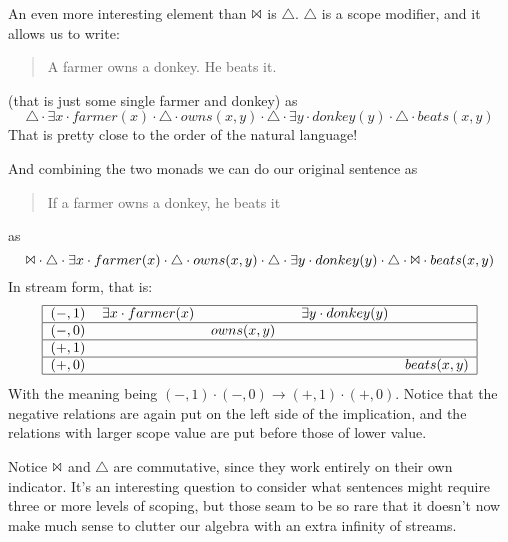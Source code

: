 \documentclass[12pt]{article}
\begin{document}
An even more interesting element than $\Bowtie$ is $\triangle$. $\triangle$ is a scope modifier, and it allows us to write:
%
\begin{quote}
A farmer owns a donkey. He beats it.
\end{quote}
%
(that is just some single farmer and donkey) as
%
\begin{equation}
\triangle \cdot \exists x \cdot farmer(x) \cdot \triangle \cdot owns(x,y) \cdot \triangle \cdot \exists y \cdot donkey(y) \cdot \triangle \cdot beats(x,y)
\end{equation}
%
That is pretty close to the order of the natural language!

And combining the two monads we can do our original sentence as
%
\begin{quote}
If a farmer owns a donkey, he beats it
\end{quote}
%
as
\begin{equation}
\Bowtie \cdot \triangle \cdot \exists x \cdot farmer(x) \cdot \triangle \cdot owns(x,y) \cdot \triangle \cdot \exists y \cdot donkey(y) \cdot \triangle \cdot \Bowtie \cdot beats(x,y)
\end{equation}
%
In stream form, that is:
%
\begin{equation}
\begin{tabular}{|cllll|}
    \hline
    $(-,1)$ & $\exists x \cdot farmer(x)$ & ~ & ~ $ \exists y \cdot donkey(y)$ & ~ \\\hline
    $(-,0)$ & ~ & $owns(x,y)$ & ~ & ~ \\\hline
    $(+,1)$ & ~ & ~ & ~ & ~ \\\hline
    $(+,0)$ & ~ & ~ & ~ & $beats(x,y)$ \\\hline
\end{tabular}
\end{equation}
%
With the meaning being $(-,1) \cdot (-,0) \rightarrow (+,1) \cdot (+,0)$. Notice that the negative relations are again put on the left side of the implication, and the relations with larger scope value are put before those of lower value.

Notice $\Bowtie$ and $\triangle$ are commutative, since they work entirely on their own indicator. It's an interesting question to consider what sentences might require three or more levels of scoping, but those seam to be so rare that it doesn't now make much sense to clutter our algebra with an extra infinity of streams.
\end{document}

